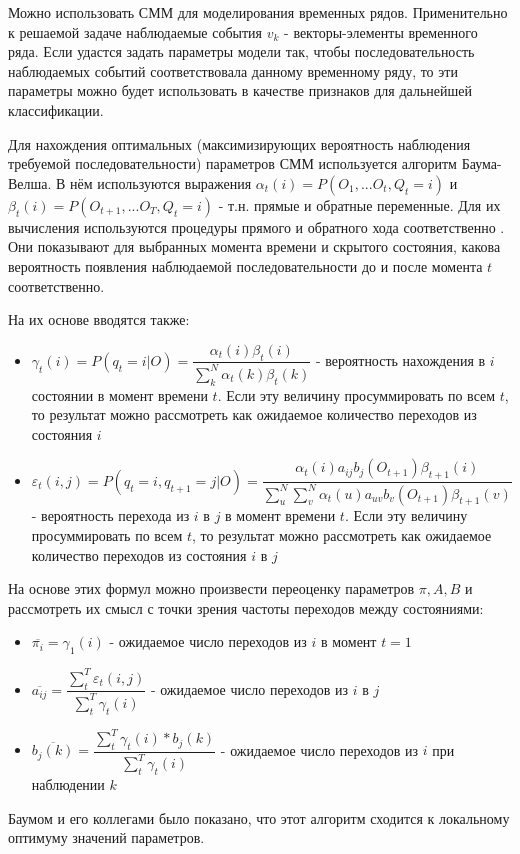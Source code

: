 Можно использовать СММ для моделирования временных рядов. Применительно к решаемой задаче наблюдаемые события $v_k$ - векторы-элементы временного ряда. Если удастся задать параметры модели так, чтобы последовательность наблюдаемых событий соответствовала данному временному ряду, то эти параметры можно будет использовать в качестве признаков для дальнейшей классификации.

Для нахождения оптимальных (максимизирующих вероятность наблюдения требуемой последовательности) параметров СММ используется алгоритм Баума-Велша.  В нём используются выражения $\alpha_t(i)=P(O_1, ... O_t , Q_t=i)$ и $\beta_t(i)=P(O_{t+1}, ... O_T , Q_t=i)$ - т.н. прямые и обратные переменные. Для их вычисления используются процедуры прямого и обратного хода соответственно \cite{ДОБАВИТЬ}. Они показывают для выбранных момента времени и скрытого состояния, какова вероятность появления наблюдаемой последовательности до и после момента $t$ соответственно. 

На их основе вводятся также:
\begin{itemize}
\item $\gamma_t(i)=P(q_t=i | O)=\dfrac{\alpha_t(i)\beta_t(i)}{\sum_k^N\alpha_t(k)\beta_t(k)}$ - вероятность нахождения в $i$ состоянии в момент времени $t$. Если эту величину просуммировать по всем $t$, то результат можно рассмотреть как ожидаемое количество переходов из состояния $i$
\item $\varepsilon_t(i,j)=P(q_t=i, q_{t+1}=j | O)=\dfrac{\alpha_t(i)a_{ij}b_j(O_{t+1})\beta_{t+1}(i)}{\sum_u^N\sum_v^N\alpha_t(u)a_{uv}b_v(O_{t+1})\beta_{t+1}(v)}$ - вероятность перехода из $i$ в $j$ в момент времени $t$. Если эту величину просуммировать по всем $t$, то результат можно рассмотреть как ожидаемое количество переходов из состояния $i$ в $j$
\end{itemize}

На основе этих формул можно произвести переоценку параметров $\pi, A, B$ и рассмотреть их смысл с точки зрения частоты переходов между состояниями:

\begin{itemize}
\item $\overline{\pi_i}=\gamma_1(i)$ - ожидаемое число переходов из $i$ в момент $t=1$
\item $\overline{a_{ij}}=\dfrac{\sum_t^T\varepsilon_t(i,j)}{\sum_t^T\gamma_t(i)}$ - ожидаемое число переходов из $i$ в $j$
\item $\overline{b_{j}(k)}=\dfrac{\sum_t^T\gamma_t(i)*b_j(k)}{\sum_t^T\gamma_t(i)}$ - ожидаемое число переходов из $i$ при наблюдении $k$
\end{itemize}

Баумом и его коллегами было показано, что этот алгоритм сходится к локальному оптимуму значений параметров.








